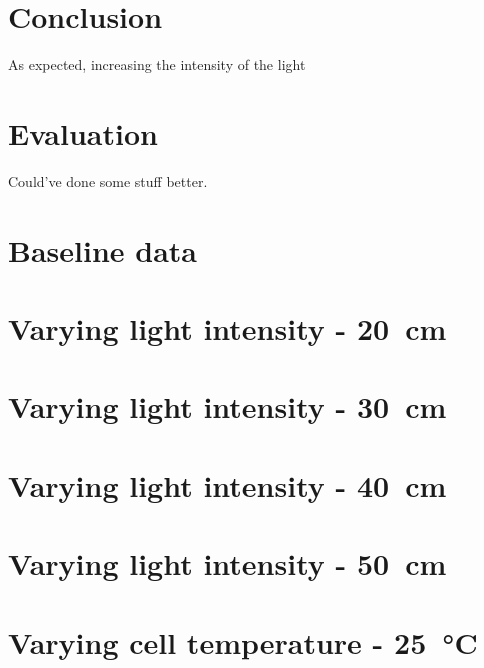 \documentclass[a4paper,11pt]{article}
\begin{document}
\section{Conclusion}
As expected, increasing the intensity of the light 

\section{Evaluation}
Could've done some stuff better.

\begin{appendices}
    \label{appendix}
    \section{Baseline data}
    \label{dat:baseline}
    
    \section{Varying light intensity - \SI{20}{\centi\metre}}
    \label{dat:d20}
        
    \section{Varying light intensity - \SI{30}{\centi\metre}}
    \label{dat:d30}
        
    \section{Varying light intensity - \SI{40}{\centi\metre}}
    \label{dat:d40}
        
    \section{Varying light intensity - \SI{50}{\centi\metre}}
    \label{dat:d50}
        
    \section{Varying cell temperature - \SI{25}{\celsius}}
    \label{dat:t25}
        

\end{appendices}
\end{document}
